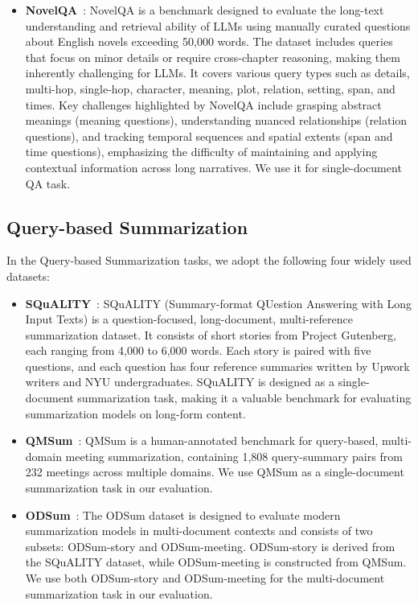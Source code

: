 \begin{itemize}[leftmargin=1em]
    \item \textbf{NovelQA}~\cite{wang2024novelqa}: NovelQA is a benchmark designed to evaluate the long-text understanding and retrieval ability of LLMs using manually curated questions about English novels exceeding 50,000 words. The dataset includes queries that focus on minor details or require cross-chapter reasoning, making them inherently challenging for LLMs. It covers various query types such as details, multi-hop, single-hop, character, meaning, plot, relation, setting, span, and times. Key challenges highlighted by NovelQA include grasping abstract meanings (meaning questions), understanding nuanced relationships (relation questions), and tracking temporal sequences and spatial extents (span and time questions), emphasizing the difficulty of maintaining and applying contextual information across long narratives. We use it for single-document QA task.
\end{itemize}


\subsection{Query-based Summarization}
\label{app:summ_dataset}
In the Query-based Summarization tasks, we adopt the following four widely used datasets:
\begin{itemize}[leftmargin=1em]
    \item \textbf{SQuALITY}~\cite{wang2022squality}: SQuALITY (Summary-format QUestion Answering with Long Input Texts) is a question-focused, long-document, multi-reference summarization dataset. It consists of short stories from Project Gutenberg, each ranging from 4,000 to 6,000 words. Each story is paired with five questions, and each question has four reference summaries written by Upwork writers and NYU undergraduates. SQuALITY is designed as a single-document summarization task, making it a valuable benchmark for evaluating summarization models on long-form content.
    \item \textbf{QMSum}~\cite{zhong2021qmsum}: QMSum is a human-annotated benchmark for query-based, multi-domain meeting summarization, containing 1,808 query-summary pairs from 232 meetings across multiple domains. We use QMSum as a single-document summarization task in our evaluation.
    \item \textbf{ODSum}~\cite{zhou2023odsum}: The ODSum dataset is designed to evaluate modern summarization models in multi-document contexts and consists of two subsets: ODSum-story and ODSum-meeting. ODSum-story is derived from the SQuALITY dataset, while ODSum-meeting is constructed from QMSum. We use both ODSum-story and ODSum-meeting for the multi-document summarization task in our evaluation.
\end{itemize} 


